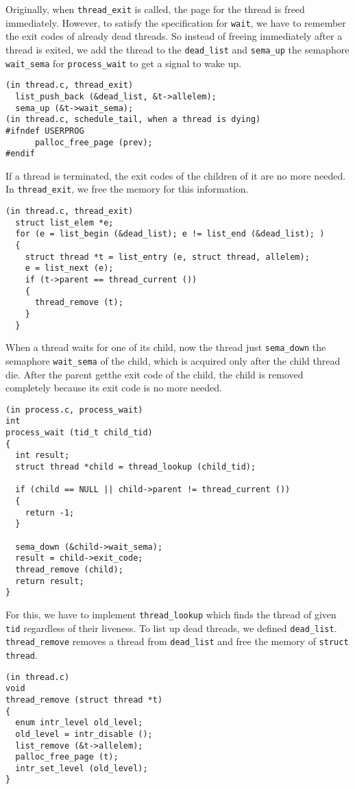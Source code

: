 \documentclass[a4paper,article,11pt,oneside]{article}
\begin{document}
Originally, when \texttt{thread\_exit} is called, the page for the
thread is freed immediately. However, to satisfy the specification for
\texttt{wait}, we have to remember the exit codes of already dead
threads. So instead of freeing immediately after a thread is exited,
we add the thread to the \texttt{dead\_list} and \texttt{sema\_up} the
semaphore \texttt{wait\_sema} for \texttt{process\_wait} to get a
signal to wake up.
\begin{verbatim}
(in thread.c, thread_exit)
  list_push_back (&dead_list, &t->allelem);
  sema_up (&t->wait_sema);
(in thread.c, schedule_tail, when a thread is dying)
#ifndef USERPROG
      palloc_free_page (prev);
#endif
\end{verbatim}

If a thread is terminated, the exit codes of the children of it are no
more needed. In \texttt{thread\_exit}, we free the memory for this information.
\begin{verbatim}
(in thread.c, thread_exit)
  struct list_elem *e;
  for (e = list_begin (&dead_list); e != list_end (&dead_list); )
  {
    struct thread *t = list_entry (e, struct thread, allelem);
    e = list_next (e);
    if (t->parent == thread_current ())
    {
      thread_remove (t);
    }
  }    
\end{verbatim}

When a thread waits for one of its child, now the thread just
\texttt{sema\_down} the semaphore \texttt{wait\_sema} of the child,
which is acquired only after the child thread die. After the parent
getthe exit code of the child, the child is removed completely because
its exit code is no more needed.
\begin{verbatim}
(in process.c, process_wait)
int
process_wait (tid_t child_tid) 
{
  int result;
  struct thread *child = thread_lookup (child_tid);

  if (child == NULL || child->parent != thread_current ())
  {
    return -1;
  }

  sema_down (&child->wait_sema);
  result = child->exit_code;
  thread_remove (child);
  return result;
}
\end{verbatim}

For this, we have to implement \texttt{thread\_lookup} which finds
the thread of given \texttt{tid} regardless of their liveness. To list
up dead threads, we defined \texttt{dead\_list}. \texttt{thread\_remove}
removes a thread from \texttt{dead\_list} and free the memory of
\texttt{struct thread}.

\begin{verbatim}
(in thread.c)
void
thread_remove (struct thread *t)
{
  enum intr_level old_level;    
  old_level = intr_disable ();
  list_remove (&t->allelem);
  palloc_free_page (t);
  intr_set_level (old_level);  
}
\end{verbatim}
\end{document}
